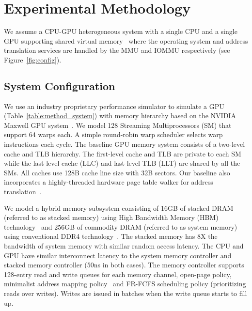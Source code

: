 
\section{Experimental Methodology}
\label{sec:method}

\noindent We assume a CPU-GPU heterogeneous system with a single CPU
and a single GPU supporting shared virtual memory~\cite{intelgen9,
amdzen} where the operating system and address translation services
are handled by the MMU and IOMMU respectively (see
Figure~\ref{fig:config}).



\subsection{System Configuration}

\noindent We use an industry proprietary performance simulator to
simulate a GPU (Table~\ref{table:method_system}) with memory hierarchy
based on the NVIDIA Maxwell GPU system~\cite{gpu_maxwell}. We model
128 Streaming Multiprocessors (SM) that support 64 warps each. A
simple round-robin warp scheduler selects warp instructions each
cycle. The baseline GPU memory system consists of a two-level cache
and TLB hierarchy. The first-level cache and TLB are private to each
SM while the last-level cache (LLC) and last-level TLB (LLT) are
shared by all the SMs. All caches use 128B cache line size with 32B
sectors. Our baseline also incorporates a highly-threaded hardware
page table walker for address translation~\cite{power2014supporting,
pichaigpu}.


We model a hybrid memory subsystem consisting of 16GB of stacked DRAM
(referred to as stacked memory) using High Bandwidth Memory (HBM)
technology~\cite{hbm-spec} and 256GB of commodity DRAM (referred to as
system memory) using conventional DDR4 technology~\cite{ddr4-spec}.
The stacked memory has 8X the bandwidth of system memory with similar
random access latency. The CPU and GPU have similar interconnect
latency to the system memory controller and stacked memory controller
(50ns in both cases). The memory controller supports 128-entry read
and write queues for each memory channel, open-page policy, minimalist
address mapping policy~\cite{minimalist} and FR-FCFS scheduling policy
(prioritizing reads over writes). Writes are issued in batches when
the write queue starts to fill up. 

